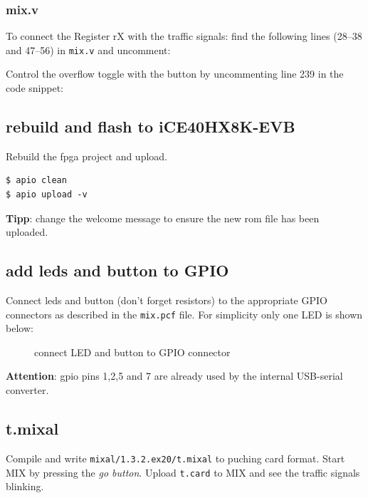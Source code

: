 \documentclass[a4paper,ngerman]{scrartcl}
\begin{document}


\subsubsection{mix.v}

To connect the Register rX with the traffic signals: find the following lines (28--38 and 47--56) in \lstinline|mix.v| and uncomment:



Control the overflow toggle with the button by uncommenting line 239 in the code snippet:



\subsection{rebuild and flash to iCE40HX8K-EVB}

Rebuild the fpga project and upload.

\begin{lstlisting}[numbers=none,frame=none]
$ apio clean
$ apio upload -v
\end{lstlisting}

\textbf{Tipp}: change the welcome message to ensure the new rom file has been uploaded.

\subsection{add leds and button to GPIO}
Connect leds and button (don't forget resistors) to the appropriate GPIO connectors as described in the \lstinline|mix.pcf| file. For simplicity only one LED is shown below:

\begin{figure}[H]
	\centering
	
	\caption{connect LED and button to GPIO connector}
	\label{fig:leds}
\end{figure}


\textbf{Attention}: gpio pins 1,2,5 and 7 are already used by the internal USB-serial converter.


\subsection{t.mixal}
Compile and write \lstinline|mixal/1.3.2.ex20/t.mixal| to puching card format. Start MIX by pressing the \textit{go button}. Upload \lstinline|t.card| to MIX and see the traffic signals blinking.
\end{document}
